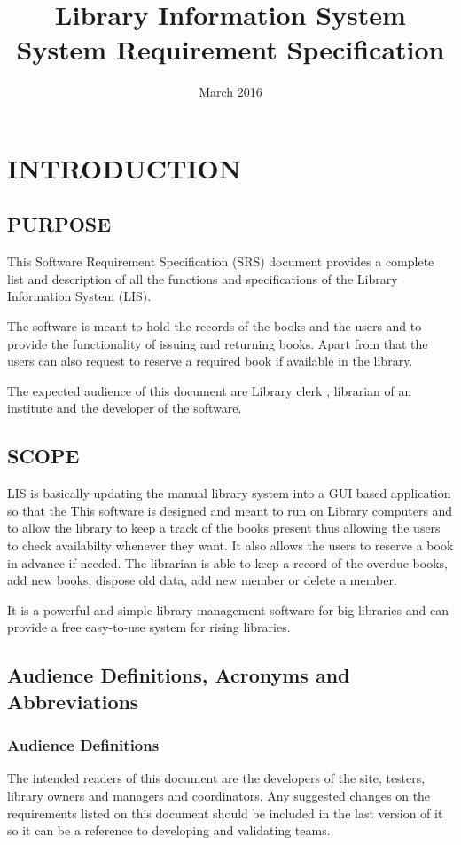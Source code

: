\documentclass{article}
\title{Library Information System\\ System Requirement Specification}
\author{}
\date{March 2016}
\begin{document}
\maketitle

\section{INTRODUCTION}

\subsection{PURPOSE}
This Software Requirement Specification (SRS) document provides a complete list and description of all the functions and specifications of the Library Information System (LIS).

The software is meant to hold the records of the books and the users and to provide the functionality of issuing and returning books. Apart from that the users can also request to reserve a required book if available in the library.

The expected audience of this document are Library clerk , librarian of an institute and the developer of the software.

\subsection{SCOPE}
LIS is basically updating the manual library system into a GUI based application so that the 
This software is designed and meant to run on Library computers and to allow the library to keep a track of the books present thus allowing the users to check availabilty whenever they want. It also allows the users to reserve a book in advance if needed. The librarian is able to keep a record of the overdue books, add new books, dispose old data, add new member or delete a member. 

It is a powerful and simple library management software for big libraries and can provide a free easy-to-use system for rising libraries.


\subsection{Audience Definitions, Acronyms and Abbreviations}
\subsubsection{Audience Definitions}
The intended readers of this document are the developers of the site, testers, library owners
and managers and coordinators.
Any suggested changes on the requirements listed on this document should be included in
the last version of it so it can be a reference to developing and validating teams.
\end{document}
